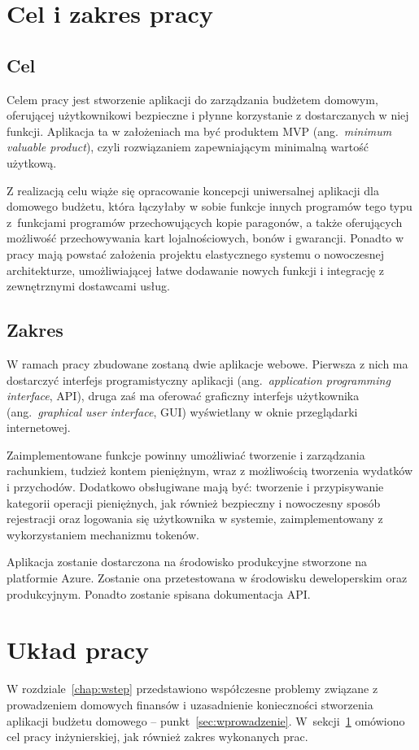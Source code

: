 \section{Cel i zakres pracy}
\label{sec:cel-zakres}
\subsection{Cel}
\label{subsec:cel}
Celem pracy jest stworzenie aplikacji do zarządzania budżetem domowym, oferującej użytkownikowi bezpieczne i płynne korzystanie z dostarczanych w niej funkcji.
Aplikacja ta w założeniach ma być produktem MVP (ang.~\emph{minimum valuable product}), czyli rozwiązaniem zapewniającym minimalną wartość użytkową.  

Z realizacją celu wiąże się opracowanie koncepcji uniwersalnej aplikacji dla domowego budżetu, która łączyłaby w sobie funkcje innych programów tego typu z~funkcjami programów przechowujących kopie paragonów, a także oferujących możliwość przechowywania kart lojalnościowych, bonów i gwarancji. 
Ponadto w pracy mają powstać założenia projektu elastycznego systemu o nowoczesnej architekturze, umożliwiającej łatwe dodawanie nowych funkcji i integrację z zewnętrznymi dostawcami usług. 

\subsection{Zakres}
\label{subsec:zakres}
W ramach pracy zbudowane zostaną dwie aplikacje webowe. Pierwsza z nich ma dostarczyć interfejs programistyczny aplikacji (ang.~\emph{application programming interface}, API), druga zaś ma oferować graficzny interfejs użytkownika (ang.~\emph{graphical user interface}, GUI) wyświetlany w oknie przeglądarki internetowej.

Zaimplementowane funkcje powinny umożliwiać tworzenie i zarządzania  rachunkiem, tudzież kontem pieniężnym, wraz z możliwością tworzenia wydatków i przychodów. Dodatkowo obsługiwane mają być: tworzenie i przypisywanie kategorii operacji pieniężnych, jak również bezpieczny i nowoczesny sposób rejestracji oraz logowania się użytkownika w systemie, zaimplementowany z wykorzystaniem mechanizmu tokenów.

Aplikacja zostanie dostarczona na środowisko produkcyjne stworzone na platformie Azure. Zostanie ona przetestowana w środowisku deweloperskim oraz produkcyjnym. Ponadto zostanie spisana dokumentacja API.

\section{Układ pracy}
\label{sec:uklad-pracy}
W rozdziale~\ref{chap:wstep} przedstawiono współczesne problemy związane z prowadzeniem domowych finansów i uzasadnienie konieczności stworzenia aplikacji budżetu domowego -- punkt~\ref{sec:wprowadzenie}. W~sekcji~\ref{sec:cel-zakres} omówiono cel pracy inżynierskiej, jak również zakres wykonanych prac.

